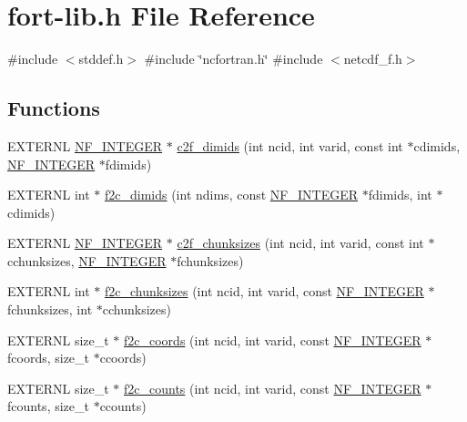 \hypertarget{fort-lib_8h}{}\section{fort-\/lib.h File Reference}
\label{fort-lib_8h}
{\ttfamily \#include $<$stddef.\+h$>$}\newline
{\ttfamily \#include \char`\"{}ncfortran.\+h\char`\"{}}\newline
{\ttfamily \#include $<$netcdf\+\_\+f.\+h$>$}\newline
\subsection*{Functions}
\begin{DoxyCompactItemize}
\item 
E\+X\+T\+E\+R\+NL \hyperlink{ncfortran_8h_a0fd3f9e9fc30661142a1fb549af678e7}{N\+F\+\_\+\+I\+N\+T\+E\+G\+ER} $\ast$ \hyperlink{fort-lib_8h_a7ad9c588c0601d0aac54053a2dfc5fb1}{c2f\+\_\+dimids} (int ncid, int varid, const int $\ast$cdimids, \hyperlink{ncfortran_8h_a0fd3f9e9fc30661142a1fb549af678e7}{N\+F\+\_\+\+I\+N\+T\+E\+G\+ER} $\ast$fdimids)
\item 
E\+X\+T\+E\+R\+NL int $\ast$ \hyperlink{fort-lib_8h_a57c6778d70be42b3e959ab2343790189}{f2c\+\_\+dimids} (int ndims, const \hyperlink{ncfortran_8h_a0fd3f9e9fc30661142a1fb549af678e7}{N\+F\+\_\+\+I\+N\+T\+E\+G\+ER} $\ast$fdimids, int $\ast$cdimids)
\item 
E\+X\+T\+E\+R\+NL \hyperlink{ncfortran_8h_a0fd3f9e9fc30661142a1fb549af678e7}{N\+F\+\_\+\+I\+N\+T\+E\+G\+ER} $\ast$ \hyperlink{fort-lib_8h_a706533cd60fe8cc16c7268db18e64aa2}{c2f\+\_\+chunksizes} (int ncid, int varid, const int $\ast$cchunksizes, \hyperlink{ncfortran_8h_a0fd3f9e9fc30661142a1fb549af678e7}{N\+F\+\_\+\+I\+N\+T\+E\+G\+ER} $\ast$fchunksizes)
\item 
E\+X\+T\+E\+R\+NL int $\ast$ \hyperlink{fort-lib_8h_a2e587a74634daa53e8e5b12772243db8}{f2c\+\_\+chunksizes} (int ncid, int varid, const \hyperlink{ncfortran_8h_a0fd3f9e9fc30661142a1fb549af678e7}{N\+F\+\_\+\+I\+N\+T\+E\+G\+ER} $\ast$fchunksizes, int $\ast$cchunksizes)
\item 
E\+X\+T\+E\+R\+NL size\+\_\+t $\ast$ \hyperlink{fort-lib_8h_a8fc727da700ba3125fbeffcddc55a44d}{f2c\+\_\+coords} (int ncid, int varid, const \hyperlink{ncfortran_8h_a0fd3f9e9fc30661142a1fb549af678e7}{N\+F\+\_\+\+I\+N\+T\+E\+G\+ER} $\ast$fcoords, size\+\_\+t $\ast$ccoords)
\item 
E\+X\+T\+E\+R\+NL size\+\_\+t $\ast$ \hyperlink{fort-lib_8h_ae9f58d950cd1f1d82faf784c4db2c115}{f2c\+\_\+counts} (int ncid, int varid, const \hyperlink{ncfortran_8h_a0fd3f9e9fc30661142a1fb549af678e7}{N\+F\+\_\+\+I\+N\+T\+E\+G\+ER} $\ast$fcounts, size\+\_\+t $\ast$ccounts)

\end{DoxyCompactItemize}
